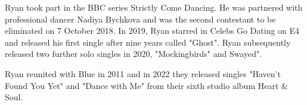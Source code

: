 \documentclass{SkripsiUnesa}
\begin{document}
\Inti



%

%

%

%

\nocite{*}


\BukaLampiran



Ryan took part in the BBC series Strictly Come Dancing. He was partnered with professional dancer Nadiya Bychkova and was the second contestant to be eliminated on 7 October 2018. In 2019, Ryan starred in Celebs Go Dating on E4 and released his first single after nine years called "Ghost". Ryan subsequently released two further solo singles in 2020, "Mockingbirds" and Swayed".

Ryan reunited with Blue in 2011 and in 2022 they released singles "Haven't Found You Yet" and "Dance with Me" from their sixth studio album Heart \& Soul.
\end{document}
